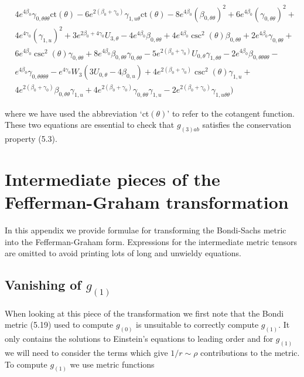 \documentclass[a4paper,11pt]{article}
\numberwithin{equation}{section}
\begin{document}
\begin{align*}
&4 e^{4 \beta_{0}} \gamma_{0, \theta \theta \theta} \text{ct}(\theta )-6 e^{2 (\beta_{0}+\gamma_{0})} \gamma_{1, u \theta} \text{ct}(\theta )-8 e^{4 \beta_{0}} (\beta_{0, \theta \theta})^2+6 e^{4 \beta_{0}} (\gamma_{0, \theta \theta})^2+\\
&4 e^{4 \gamma_{0}} (\gamma_{1,u})^2+3 e^{2 \beta_{0}+4 \gamma_{0}} U_{3, \theta}-4 e^{4 \beta_{0}} \beta_{0, \theta \theta}+4 e^{4 \beta_{0}} \csc ^2(\theta ) \beta_{0, \theta \theta}+2 e^{4 \beta_{0}} \gamma_{0, \theta \theta}+\\
&6 e^{4 \beta_{0}} \csc ^2(\theta ) \gamma_{0, \theta \theta}+8 e^{4 \beta_{0}} \beta_{0, \theta \theta} \gamma_{0, \theta \theta}-5 e^{2 (\beta_{0}+\gamma_{0})} U_{0, \theta} \gamma_{1, \theta \theta}-2 e^{4 \beta_{0}} \beta_{0, \theta \theta \theta \theta}-\\
&e^{4 \beta_{0}} \gamma_{0, \theta \theta \theta \theta}-e^{4 \gamma_{0}} W_{3} (3 U_{0, \theta}-4 \beta_{0,u})+4 e^{2 (\beta_{0}+\gamma_{0})} \csc ^2(\theta ) \gamma_{1,u}+\\
&4 e^{2 (\beta_{0}+\gamma_{0})} \beta_{0, \theta \theta} \gamma_{1,u}+4 e^{2 (\beta_{0}+\gamma_{0})} \gamma_{0, \theta \theta} \gamma_{1,u}-2 e^{2 (\beta_{0}+\gamma_{0})} \gamma_{1, u \theta \theta}) \tag{A.2}
\end{align*}

\noindent where we have used the abbreviation `ct$(\theta)$' to refer to the cotangent function. These two equations are essential to check that $g_{(3)ab}$ satisfies the conservation property (5.3).

\section{Intermediate pieces of the Fefferman-Graham transformation}  \label{sec: FG_appendix}


In this appendix we provide formulae for transforming the Bondi-Sachs metric into the Fefferman-Graham form. Expressions for the intermediate metric tensors are omitted to avoid printing lots of long and unwieldy equations.

\subsection{Vanishing of $g_{(1)}$}

\noindent When looking at this piece of the transformation we first note that the Bondi metric (5.19) used to compute $g_{(0)}$  is unsuitable to correctly compute $g_{(1)}$. It only contains the solutions to Einstein's equations to leading order and for $g_{(1)}$ we will need to consider the terms which give $1/r \sim \rho$ contributions to the metric. To compute $g_{(1)}$ we use metric functions
\end{document}
